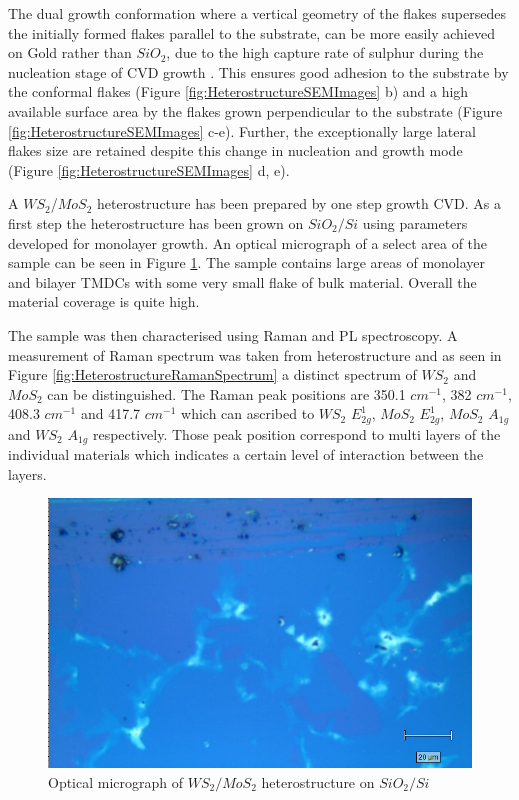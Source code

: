 The dual growth conformation where a vertical geometry of the flakes supersedes the initially formed flakes parallel to the substrate, can be more easily achieved on Gold rather than $SiO_2$, due to the high capture rate of sulphur during the nucleation stage of CVD growth \cite{Gao2015}. This ensures good adhesion to the substrate by the conformal flakes (Figure \ref{fig:HeterostructureSEMImages} b) and a high available surface area by the flakes grown perpendicular to the substrate (Figure \ref{fig:HeterostructureSEMImages} c-e). Further, the exceptionally large lateral flakes size are retained despite this change in nucleation and growth mode (Figure \ref{fig:HeterostructureSEMImages} d, e).


A $WS_2$/$MoS_2$ heterostructure has been prepared by one step growth CVD. As a first step the heterostructure has been grown on $SiO_2/Si$ using parameters developed for monolayer growth. An optical micrograph of a select area of the sample can be seen in Figure \ref{fig:HeterostructureOMSi}. The sample contains large areas of monolayer and bilayer TMDCs with some very small flake of bulk material. Overall the material coverage is quite high.

The sample was then characterised using Raman and PL spectroscopy. A measurement of Raman spectrum was taken from heterostructure and as seen in Figure \ref{fig:HeterostructureRamanSpectrum} a distinct spectrum of $WS_2$ and $MoS_2$ can be distinguished. The Raman peak positions are 350.1 $cm^{-1}$, 382 $cm^{-1}$, 408.3 $cm^{-1}$ and 417.7 $cm^{-1}$ which can ascribed to $WS_2$ $E^1_{2g}$, $MoS_2$ $E^1_{2g}$, $MoS_2$ $A_{1g}$ and $WS_2$ $A_{1g}$ respectively. Those peak position correspond to multi layers of the individual materials which indicates a certain level of interaction between the layers.

\begin{figure}[h]
	\begin{center}
		\includegraphics[scale=0.5]{Heterostructures/OmSi.png}
		\caption{Optical micrograph of $WS_2/MoS_2$ heterostructure on $SiO_2/Si$}
		\label{fig:HeterostructureOMSi}
	\end{center}
\end{figure}


